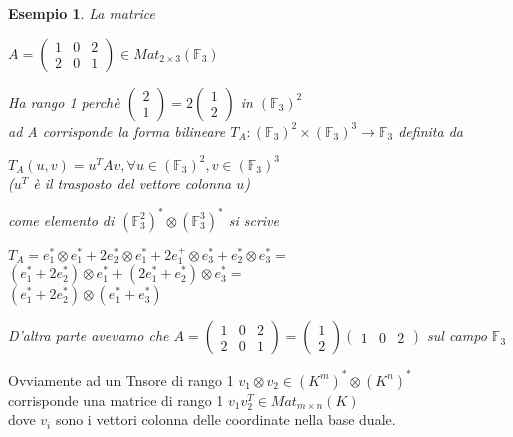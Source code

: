 \documentclass[a4paper,12pt]{article}
\theoremstyle{def}
\theoremstyle{prop}
\theoremstyle{esempio}
\newtheorem*{example}{Esempio}
\theoremstyle{dimostrazione}
\theoremstyle{teo}
\theoremstyle{osservazione}
\begin{document}
\begin{example}
	La matrice
	\begin{center}
		\(A = \begin{pmatrix}
			1 & 0 & 2 \\
			2 & 0 & 1
		\end{pmatrix} \in Mat_{2 \times 3}(\mathbb{F}_3)\)
	\end{center}
	Ha rango 1 perchè
	\(\begin{pmatrix}
		2 \\
		1
	\end{pmatrix} = 2
	\begin{pmatrix}
		1 \\
		2
	\end{pmatrix}\) in \((\mathbb{F}_3)^2\)\\
	ad A corrisponde la forma bilineare \(T_A: (\mathbb{F}_3)^2 \times (\mathbb{F}_3)^3 \rightarrow \mathbb{F}_3\) definita da
	\begin{center}
		\(T_A(u, v) = u^T A v, \forall u \in (\mathbb{F}_3)^2, v \in (\mathbb{F}_3)^3\)\\
		(\(u^T\) è il trasposto del vettore colonna \(u\))
	\end{center}
	come elemento di \((\mathbb{F}_3^2)^* \otimes (\mathbb{F}_3^3)^*\) si scrive
	\begin{center}
		\(T_A = e_1^* \otimes e_1^* + 2 e_2^* \otimes e_1^* + 2 e_1^+ \otimes e_3^* + e_2^* \otimes e_3^* = \)\\
		\((e_1^* + 2 e_2^*) \otimes e_1^* + (2 e_1^* + e_2^*) \otimes e_3^* = \)\\
		\((e_1^* + 2 e_2^*) \otimes (e_1^* + e_3^*)\)
	\end{center}
	D'altra parte avevamo che \(A = \begin{pmatrix}
		1 & 0 & 2 \\
		2 & 0 & 1
	\end{pmatrix} = \begin{pmatrix}
		1 \\
		2
	\end{pmatrix} \begin{pmatrix}
		1 & 0 & 2
	\end{pmatrix}\) sul campo \(\mathbb{F}_3\)
\end{example}

Ovviamente ad un Tnsore di rango 1 \(v_1 \otimes v_2 \in (K^m)^* \otimes (K^n)^*\)\\
corrisponde una matrice di rango 1 \(v_1 v_2^T \in Mat_{m \times n}(K)\)\\
dove \(v_i\) sono i vettori colonna delle coordinate nella base duale.
\end{document}
